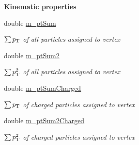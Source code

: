 \begin{Indent}{\bf Kinematic properties}\par
\begin{CompactItemize}
\item 
\hypertarget{classVertex_dc61358e6e4e00f57ce67ab8f3769eb2}{
double \hyperlink{classVertex_dc61358e6e4e00f57ce67ab8f3769eb2}{m\_\-pt\-Sum}}
\label{classVertex_dc61358e6e4e00f57ce67ab8f3769eb2}

\begin{CompactList}\small\item\em $ \sum{p_{\rm T}} $ of all particles assigned to vertex \item\end{CompactList}\item 
\hypertarget{classVertex_6c463f49c3f48f6b34a38a9436770c56}{
double \hyperlink{classVertex_6c463f49c3f48f6b34a38a9436770c56}{m\_\-pt\-Sum2}}
\label{classVertex_6c463f49c3f48f6b34a38a9436770c56}

\begin{CompactList}\small\item\em $ \sum{p_{\rm T}^{2}} $ of all particles assigned to vertex \item\end{CompactList}\item 
\hypertarget{classVertex_7f08ec24f1d4340309565be2781b4da2}{
double \hyperlink{classVertex_7f08ec24f1d4340309565be2781b4da2}{m\_\-pt\-Sum\-Charged}}
\label{classVertex_7f08ec24f1d4340309565be2781b4da2}

\begin{CompactList}\small\item\em $ \sum{p_{\rm T}} $ of charged particles assigned to vertex \item\end{CompactList}\item 
\hypertarget{classVertex_1318130e63fc95daf80f1784be176fb4}{
double \hyperlink{classVertex_1318130e63fc95daf80f1784be176fb4}{m\_\-pt\-Sum2Charged}}
\label{classVertex_1318130e63fc95daf80f1784be176fb4}

\begin{CompactList}\small\item\em $ \sum{p_{\rm T}^{2}} $ of charged particles assigned to vertex \item\end{CompactList}\end{CompactItemize}
\end{Indent}
